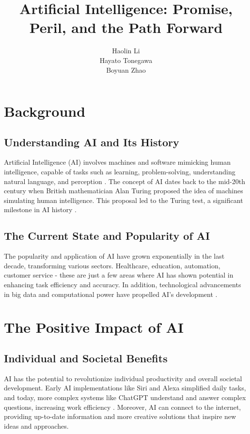 \documentclass[man]{apa7}
\title{Artificial Intelligence: Promise, Peril, and the Path Forward}
\author{Haolin Li\\Hayato Tonegawa\\Boyuan Zhao}
\affiliation{University of California\, Berkeley Extention}
\begin{document}
\maketitle


\section{Background}

\subsection{Understanding AI and Its History}
Artificial Intelligence (AI) involves machines and software mimicking human intelligence, capable of tasks such as learning, problem-solving, understanding natural language, and perception \parencite{russell2020}. The concept of AI dates back to the mid-20th century when British mathematician Alan Turing proposed the idea of machines simulating human intelligence. This proposal led to the Turing test, a significant milestone in AI history \parencite{turing1950computing}.

\subsection{The Current State and Popularity of AI}
The popularity and application of AI have grown exponentially in the last decade, transforming various sectors. Healthcare, education, automation, customer service - these are just a few areas where AI has shown potential in enhancing task efficiency and accuracy. In addition, technological advancements in big data and computational power have propelled AI's development \parencite{suthaharan2016}.

\section{The Positive Impact of AI}

\subsection{Individual and Societal Benefits}
AI has the potential to revolutionize individual productivity and overall societal development. Early AI implementations like Siri and Alexa simplified daily tasks, and today, more complex systems like ChatGPT understand and answer complex questions, increasing work efficiency \parencite{radford2019language}. Moreover, AI can connect to the internet, providing up-to-date information and more creative solutions that inspire new ideas and approaches.
\end{document}
